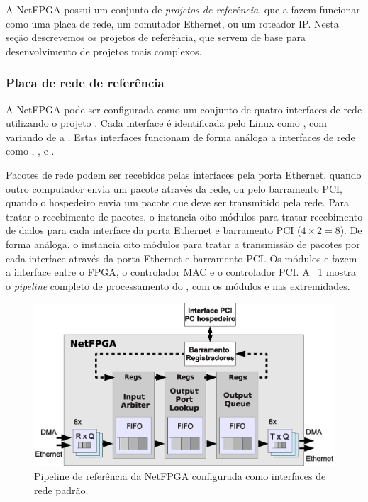 A NetFPGA possui um conjunto de \emph{projetos de referência}, que a
fazem funcionar como uma placa de rede, um comutador Ethernet, ou um
roteador IP.  Nesta seção descrevemos os projetos de referência, que
servem de base para desenvolvimento de projetos mais complexos.

\subsubsection*{Placa de rede de referência}

A NetFPGA pode ser configurada como um conjunto de quatro interfaces
de rede utilizando o projeto .  Cada interface é
identificada pelo Linux como , com  variando de
 a .  Estas interfaces funcionam de forma análoga a
interfaces de rede como , , e .

Pacotes de rede podem ser recebidos pelas interfaces 
pela porta Ethernet, quando outro computador envia um pacote através
da rede, ou pelo barramento PCI, quando o hospedeiro envia um pacote
que deve ser transmitido pela rede.  Para tratar o recebimento de
pacotes, o  instancia oito módulos
 para tratar recebimento de dados para cada interface
da porta Ethernet e barramento PCI ($4 \times 2 = 8$).  De forma
análoga, o  instancia oito módulos
 para tratar a transmissão de pacotes por cada
interface através da porta Ethernet e barramento PCI.  Os módulos
 e  fazem a interface entre o FPGA, o
controlador MAC e o controlador PCI.  A
\figstr~\ref{fig:arch.pipe.iface} mostra o \emph{pipeline} completo
de processamento do , com os módulos
 e  nas extremidades.

\begin{figure}
\centering
\includegraphics[scale=0.6,angle=0]{figures/modulos/datapathhor2.eps}
\caption{Pipeline de referência da NetFPGA configurada como interfaces de rede padrão.}
\label{fig:arch.pipe.iface}
\end{figure}

